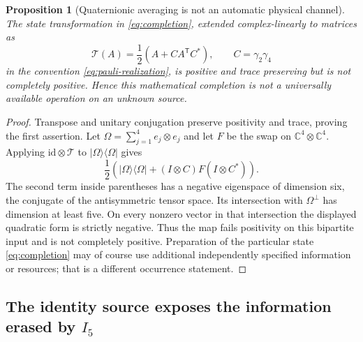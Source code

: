 \documentclass[11pt]{article}
\newtheorem{proposition}[proposition]{Proposition}
\theoremstyle{definition}
\theoremstyle{remark}
\newcommand{\C}{\mathbb C}
\newcommand{\id}{\mathrm{id}}
\newcommand{\ketbra}[1]{|#1\rangle\langle#1|}
\begin{document}
\begin{proposition}[Quaternionic averaging is not an automatic physical channel]
\label{prop:not-CP}
The state transformation in \eqref{eq:completion}, extended complex-linearly
to matrices as
\begin{equation}
 \mathcal T(A)=\frac12(A+C A^{\mathsf T}C^*),
 \qquad C=\gamma_2\gamma_4
 \label{eq:positive-notCP}
\end{equation}
in the convention \eqref{eq:pauli-realization}, is positive and trace
preserving but is not completely positive. Hence this mathematical
completion is not a universally available operation on an unknown source.
\end{proposition}
\begin{proof}
Transpose and unitary conjugation preserve positivity and trace, proving the
first assertion. Let $\Omega=\sum_{j=1}^4e_j\otimes e_j$ and let $F$ be the
swap on $\C^4\otimes\C^4$. Applying $\id\otimes\mathcal T$ to
$\ketbra\Omega$ gives
\[
 \frac12\left(\ketbra\Omega+(I\otimes C)F(I\otimes C^*)\right).
\]
The second term inside parentheses has a negative eigenspace of dimension
six, the conjugate of the antisymmetric tensor space. Its intersection
with $\Omega^\perp$ has dimension at least five. On every nonzero vector
in that intersection the displayed quadratic form is strictly negative.
Thus the map fails positivity on this bipartite input and is not completely
positive. Preparation of the particular state \eqref{eq:completion} may of
course use additional independently specified information or resources;
that is a different occurrence statement.
\end{proof}

\subsection{The identity source exposes the information erased by \texorpdfstring{$I_5$}{the identity Gram}}
\end{document}
